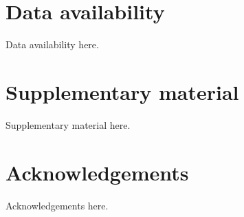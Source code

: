 \documentclass[preprint,12pt]{elsarticle}
\begin{document}
\section*{Data availability}
Data availability here.

\section*{Supplementary material}
Supplementary material here.

\section*{Acknowledgements}
Acknowledgements here.




\end{document}
